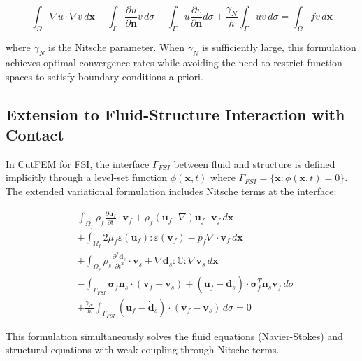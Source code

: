 ﻿\documentclass[a4paper,11pt]{article}
\theoremstyle{definition}
\begin{document}
\begin{equation}
\int_\Omega \nabla u \cdot \nabla v \, d\mathbf{x} - \int_\Gamma \frac{\partial u}{\partial \mathbf{n}} v \, d\sigma - \int_\Gamma u \frac{\partial v}{\partial \mathbf{n}} d\sigma + \frac{\gamma_N}{h} \int_\Gamma u v \, d\sigma = \int_\Omega f v \, d\mathbf{x}
\end{equation}

where $\gamma_N$ is the Nitsche parameter. When $\gamma_N$ is sufficiently large, this formulation achieves optimal convergence rates while avoiding the need to restrict function spaces to satisfy boundary conditions a priori.

\subsection{Extension to Fluid-Structure Interaction with Contact}

In CutFEM for FSI, the interface $\Gamma_{FSI}$ between fluid and structure is defined implicitly through a level-set function $\phi(\mathbf{x}, t)$ where $\Gamma_{FSI} = \{\mathbf{x} : \phi(\mathbf{x}, t) = 0\}$. The extended variational formulation includes Nitsche terms at the interface:

\begin{equation}
\begin{split}
&\int_{\Omega_f} \rho_f \frac{\partial \mathbf{u}_f}{\partial t} \cdot \mathbf{v}_f + \rho_f (\mathbf{u}_f \cdot \nabla) \mathbf{u}_f \cdot \mathbf{v}_f \, d\mathbf{x} \\
&+ \int_{\Omega_f} 2\mu_f \varepsilon(\mathbf{u}_f) : \varepsilon(\mathbf{v}_f) - p_f \nabla \cdot \mathbf{v}_f \, d\mathbf{x} \\
&+ \int_{\Omega_s} \rho_s \frac{\partial^2 \mathbf{d}_s}{\partial t^2} \cdot \mathbf{v}_s + \nabla \mathbf{d}_s : \mathbb{C} : \nabla \mathbf{v}_s \, d\mathbf{x} \\
&- \int_{\Gamma_{FSI}} \boldsymbol{\sigma}_f \mathbf{n}_s \cdot (\mathbf{v}_f - \mathbf{v}_s) + (\mathbf{u}_f - \dot{\mathbf{d}}_s) \cdot \boldsymbol{\sigma}_f^T \mathbf{n}_s \mathbf{v}_f \, d\sigma \\
&+ \frac{\gamma_N}{h} \int_{\Gamma_{FSI}} (\mathbf{u}_f - \dot{\mathbf{d}}_s) \cdot (\mathbf{v}_f - \mathbf{v}_s) \, d\sigma = 0
\end{split}
\end{equation}

This formulation simultaneously solves the fluid equations (Navier-Stokes) and structural equations with weak coupling through Nitsche terms.
\end{document}
